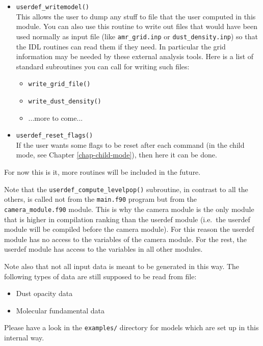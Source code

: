 \documentclass{report}
\begin{document}
\begin{itemize}
  {\small\tt radmc3d.inp} file. 
\item {\small\tt userdef\_writemodel()}\\
  This allows the user to dump any stuff to file that the user computed
  in this module. You can also use this routine to write out files that would
  have been used normally as input file (like {\small\tt amr\_grid.inp} or
  {\small\tt dust\_density.inp}) so that the IDL routines can read them if
  they need. In particular the grid information may be needed by these
  external analysis tools. Here is a list of standard subroutines you can
  call for writing such files:
  \begin{itemize}
    \item {\small\tt write\_grid\_file()}
    \item {\small\tt write\_dust\_density()}
    \item ...more to come...
  \end{itemize}
\item {\small\tt userdef\_reset\_flags()}\\
  If the user wants some flags to be reset after each command (in the
  child mode, see Chapter \ref{chap-child-mode}), then here it can be
  done.
\end{itemize}
For now this is it, more routines will be included in the future.

Note that the {\small\tt userdef\_compute\_levelpop()} subroutine, in
contrast to all the others, is called not from the {\small\tt main.f90}
program but from the {\small\tt camera\_module.f90} module. This is why the
camera module is the only module that is higher in compilation ranking than
the userdef module (i.e.\ the userdef module will be compiled before the
camera module). For this reason the userdef module has no access to the
variables of the camera module. For the rest, the userdef module has access
to the variables in all other modules.

Note also that not all input data is meant to be generated in this way. The
following types of data are still supposed to be read from file:
\begin{itemize}
  \item Dust opacity data
  \item Molecular fundamental data
\end{itemize}

Please have a look in the {\small\tt examples/} directory for models 
which are set up in this internal way.
\end{document}
